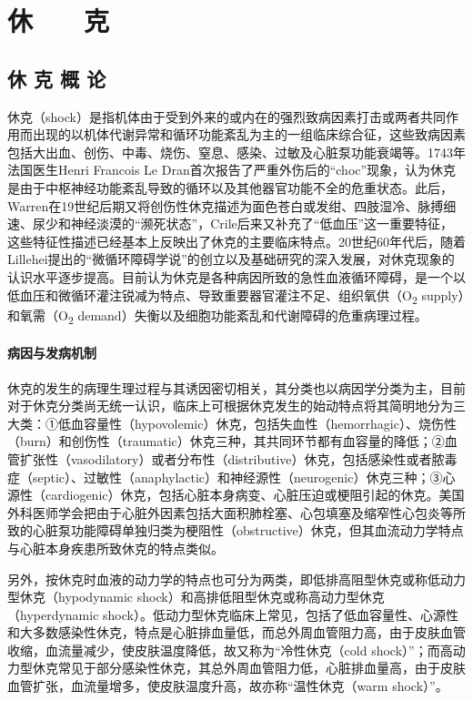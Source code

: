 \part{休　　克}

\chapter{休 克 概 论}

休克（shock）是指机体由于受到外来的或内在的强烈致病因素打击或两者共同作用而出现的以机体代谢异常和循环功能紊乱为主的一组临床综合征，这些致病因素包括大出血、创伤、中毒、烧伤、窒息、感染、过敏及心脏泵功能衰竭等。1743年法国医生Henri
Francois Le
Dran首次报告了严重外伤后的“choc”现象，认为休克是由于中枢神经功能紊乱导致的循环以及其他器官功能不全的危重状态。此后，Warren在19世纪后期又将创伤性休克描述为面色苍白或发绀、四肢湿冷、脉搏细速、尿少和神经淡漠的“濒死状态”，Crile后来又补充了“低血压”这一重要特征，这些特征性描述已经基本上反映出了休克的主要临床特点。20世纪60年代后，随着Lillehei提出的“微循环障碍学说”的创立以及基础研究的深入发展，对休克现象的认识水平逐步提高。目前认为休克是各种病因所致的急性血液循环障碍，是一个以低血压和微循环灌注锐减为特点、导致重要器官灌注不足、组织氧供（O\textsubscript{2}
supply）和氧需（O\textsubscript{2}
demand）失衡以及细胞功能紊乱和代谢障碍的危重病理过程。

\subsection{病因与发病机制}

休克的发生的病理生理过程与其诱因密切相关，其分类也以病因学分类为主，目前对于休克分类尚无统一认识，临床上可根据休克发生的始动特点将其简明地分为三大类：①低血容量性（hypovolemic）休克，包括失血性（hemorrhagic）、烧伤性（burn）和创伤性（traumatic）休克三种，其共同环节都有血容量的降低；②血管扩张性（vasodilatory）或者分布性（distributive）休克，包括感染性或者脓毒症（septic）、过敏性（anaphylactic）和神经源性（neurogenic）休克三种；③心源性（cardiogenic）休克，包括心脏本身病变、心脏压迫或梗阻引起的休克。美国外科医师学会把由于心脏外因素包括大面积肺栓塞、心包填塞及缩窄性心包炎等所致的心脏泵功能障碍单独归类为梗阻性（obstructive）休克，但其血流动力学特点与心脏本身疾患所致休克的特点类似。

另外，按休克时血液的动力学的特点也可分为两类，即低排高阻型休克或称低动力型休克（hypodynamic
shock）和高排低阻型休克或称高动力型休克（hyperdynamic
shock）。低动力型休克临床上常见，包括了低血容量性、心源性和大多数感染性休克，特点是心脏排血量低，而总外周血管阻力高，由于皮肤血管收缩，血流量减少，使皮肤温度降低，故又称为“冷性休克（cold
shock）”；而高动力型休克常见于部分感染性休克，其总外周血管阻力低，心脏排血量高，由于皮肤血管扩张，血流量增多，使皮肤温度升高，故亦称“温性休克（warm
shock）”。

